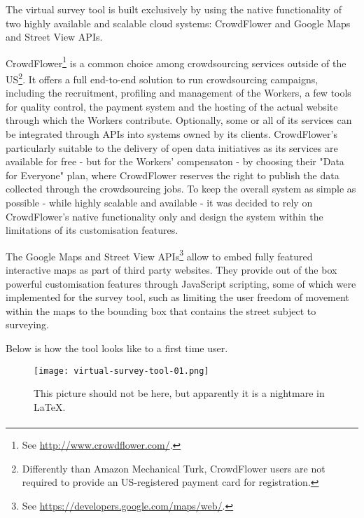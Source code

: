         The virtual survey tool is built exclusively by using the native functionality of two highly available and scalable cloud systems: CrowdFlower and Google Maps and Street View APIs. 
        
        CrowdFlower\footnote{See \url{http://www.crowdflower.com/}.} is a common choice among crowdsourcing services outside of the US\footnote{Differently than Amazon Mechanical Turk, CrowdFlower users are not required to provide an US-registered payment card for registration.}. It offers a full end-to-end solution to run crowdsourcing campaigns, including the recruitment, profiling and management of the Workers, a few tools for quality control, the payment system and the hosting of the actual website through which the Workers contribute. Optionally, some or all of its services can be integrated through APIs into systems owned by its clients. CrowdFlower's particularly suitable to the delivery of open data initiatives as its services are available for free - but for the Workers' compensaton - by choosing their "Data for Everyone" plan, where CrowdFlower reserves the right to publish the data collected through the crowdsourcing jobs. To keep the overall system as simple as possible - while highly scalable and available - it was decided to rely on CrowdFlower's native functionality only and design the system within the limitations of its customisation features.

        The Google Maps and Street View APIs\footnote{See \url{https://developers.google.com/maps/web/}.} allow to embed fully featured interactive maps as part of third party websites. They provide out of the box powerful customisation features through JavaScript scripting, some of which were implemented for the survey tool, such as limiting the user freedom of movement within the maps to the bounding box that contains the street subject to surveying.   
        
        Below is how the tool looks like to a first time user.
    
        \begin{figure*}
        	\texttt{[image: virtual-survey-tool-01.png]}
        	\caption{This picture should not be here, but apparently it is a nightmare in LaTeX.}
        	\label{fig:some_figure}
        \end{figure*}
        
        \paragraph{}

